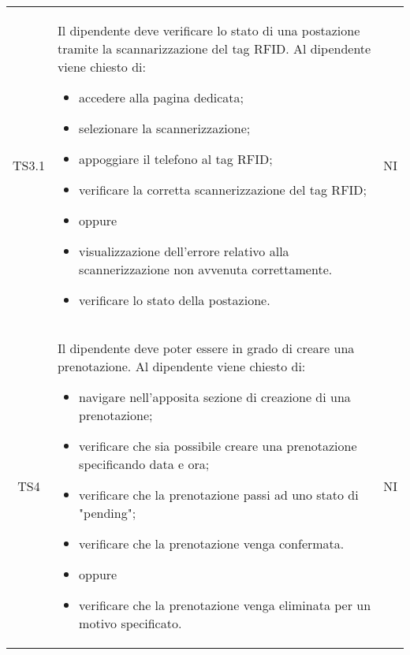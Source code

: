 {\begin{longtable}{ c C{11cm} c }
        TS3.1&
        \begin{flushleft}
            Il dipendente deve verificare lo stato di una postazione tramite la scannarizzazione del tag RFID.\newline
            Al dipendente viene chiesto di:
        \end{flushleft}
        \begin{itemize}
            \item accedere alla pagina dedicata;
            \item selezionare la scannerizzazione;
            \item appoggiare il telefono al tag RFID;
            \item verificare la corretta scannerizzazione del tag RFID;
            \item [] oppure
            \item visualizzazione dell'errore relativo alla scannerizzazione non avvenuta correttamente.
            \item verificare lo stato della postazione.
        \end{itemize}&
        NI\\


        TS4&
        \begin{flushleft}
            Il dipendente deve poter essere in grado di creare una prenotazione.
            Al dipendente viene chiesto di:
        \end{flushleft}
        \begin{itemize}
            \item navigare nell'apposita sezione di creazione di una prenotazione;
            \item verificare che sia possibile creare una prenotazione specificando data e ora;
            \item verificare che la prenotazione passi ad uno stato di "pending";
            \item verificare che la prenotazione venga confermata.
            \item [] oppure
            \item verificare che la prenotazione venga eliminata per un motivo specificato.
        \end{itemize}&
        NI\\


\end{longtable}}
